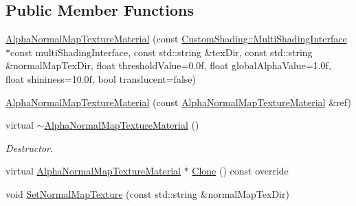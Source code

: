 \subsection*{Public Member Functions}
\begin{DoxyCompactItemize}
\item 
\mbox{\hyperlink{class_geometry_engine_1_1_geometry_material_1_1_alpha_normal_map_texture_material_a0826154e4032d64ed979176f9a6c6ddf}{Alpha\+Normal\+Map\+Texture\+Material}} (const \mbox{\hyperlink{class_geometry_engine_1_1_custom_shading_1_1_multi_shading_interface}{Custom\+Shading\+::\+Multi\+Shading\+Interface}} $\ast$const multi\+Shading\+Interface, const std\+::string \&tex\+Dir, const std\+::string \&normal\+Map\+Tex\+Dir, float threshold\+Value=0.\+0f, float global\+Alpha\+Value=1.\+0f, float shininess=10.\+0f, bool translucent=false)
\item 
\mbox{\hyperlink{class_geometry_engine_1_1_geometry_material_1_1_alpha_normal_map_texture_material_acc0c412a7f227444958bf1249eedb34d}{Alpha\+Normal\+Map\+Texture\+Material}} (const \mbox{\hyperlink{class_geometry_engine_1_1_geometry_material_1_1_alpha_normal_map_texture_material}{Alpha\+Normal\+Map\+Texture\+Material}} \&ref)
\item 
\mbox{\label{class_geometry_engine_1_1_geometry_material_1_1_alpha_normal_map_texture_material_a2148df342bc4b1907ca404970d0593cd}} 
virtual \mbox{\hyperlink{class_geometry_engine_1_1_geometry_material_1_1_alpha_normal_map_texture_material_a2148df342bc4b1907ca404970d0593cd}{$\sim$\+Alpha\+Normal\+Map\+Texture\+Material}} ()
\begin{DoxyCompactList}\small\item\em Destructor. \end{DoxyCompactList}\item 
virtual \mbox{\hyperlink{class_geometry_engine_1_1_geometry_material_1_1_alpha_normal_map_texture_material}{Alpha\+Normal\+Map\+Texture\+Material}} $\ast$ \mbox{\hyperlink{class_geometry_engine_1_1_geometry_material_1_1_alpha_normal_map_texture_material_a4dff732a06c94a7761a054ca62dbd491}{Clone}} () const override
\item 
void \mbox{\hyperlink{class_geometry_engine_1_1_geometry_material_1_1_alpha_normal_map_texture_material_a188ebcb934a89af6c130a0a787aa1c1e}{Set\+Normal\+Map\+Texture}} (const std\+::string \&normal\+Map\+Tex\+Dir)
\item 
\mbox{\label{class_geometry_engine_1_1_geometry_material_1_1_alpha_normal_map_texture_material_a49dd763e0d239fed2ddaf389de36a692}} 

\end{DoxyCompactItemize}
